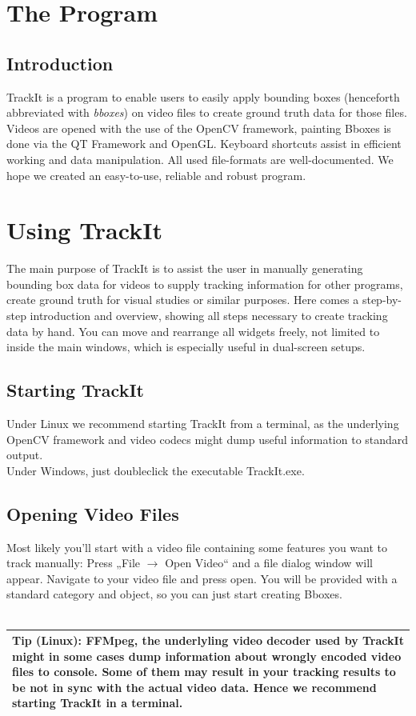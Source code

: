 \section{The Program}
   \subsection{Introduction}
   TrackIt is a program to enable users to easily apply bounding boxes (henceforth abbreviated with \emph{bboxes}) on video files to create ground truth data for those files. Videos are opened with the use of the OpenCV framework, painting Bboxes is done via the QT Framework and OpenGL. Keyboard shortcuts assist in efficient working and data manipulation. All used file-formats are well-documented. We hope we created an easy-to-use, reliable and robust program.

\section{Using TrackIt}
The main purpose of TrackIt is to assist the user in manually generating bounding box data for videos to supply tracking information for other programs, create ground truth for visual studies or similar purposes. Here comes a step-by-step introduction and overview, showing all steps necessary to create tracking data by hand. You can move and rearrange all widgets freely, not limited to inside the main windows, which is especially useful in dual-screen setups.

\subsection{Starting TrackIt}
Under Linux we recommend starting TrackIt from a terminal, as the underlying OpenCV framework and video codecs might dump useful information to standard output.\\
Under Windows, just doubleclick the executable TrackIt.exe.

   
\subsection{Opening Video Files}
      Most likely you'll start with a video file containing some features you want to track manually: Press „File $\rightarrow$ Open Video“ and a file dialog window will appear. Navigate to your video file and press open. You will be provided with a standard category and object, so you can just start creating Bboxes.\\
\\
   \begin{tabular}[H]{|p{}|}
   \hline
Tip (Linux): FFMpeg, the underlyling video decoder used by TrackIt might in some cases dump information about wrongly encoded video files to console. Some of them may result in your tracking results to be not in sync  with the actual video data. Hence we recommend starting TrackIt in a terminal.\\
   \hline
   \end{tabular}


